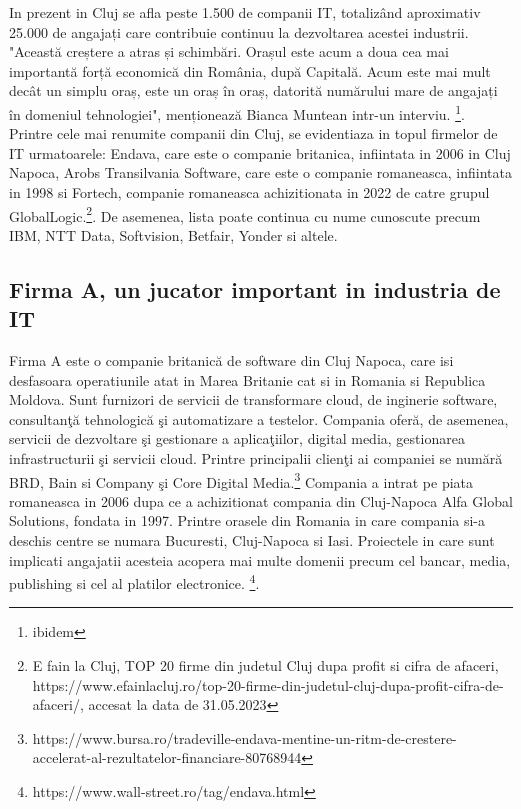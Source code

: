 \documentclass[a4paper, 12pt]{article}
\begin{document}
	\quad \quad In prezent in Cluj se afla peste 1.500 de companii IT, totalizând aproximativ 25.000 de angajați care contribuie continuu la dezvoltarea acestei industrii. "Această creștere a atras și schimbări. Orașul este acum a doua cea mai importantă forță economică din România, după Capitală. Acum este mai mult decât un simplu oraș, este un oraș în oraș, datorită numărului mare de angajați în domeniul tehnologiei", menționează Bianca Muntean intr-un interviu. \footnote{ibidem}. Printre cele mai renumite companii din Cluj, se evidentiaza in topul firmelor de IT urmatoarele: Endava, care este o companie britanica, infiintata in 2006 in Cluj Napoca, Arobs Transilvania Software, care este o companie romaneasca, infiintata in 1998 si Fortech, companie romaneasca achizitionata in 2022 de catre grupul GlobalLogic.\footnote{E fain la Cluj, TOP 20 firme din judetul Cluj dupa profit si cifra de afaceri, https://www.efainlacluj.ro/top-20-firme-din-judetul-cluj-dupa-profit-cifra-de-afaceri/, accesat la data de 31.05.2023}. De asemenea, lista poate continua cu nume cunoscute precum IBM, NTT Data, Softvision, Betfair, Yonder si altele.




	\subsection {Firma A, un jucator important in industria de IT}

	\quad\quad Firma A este o companie britanică de software din Cluj Napoca, care isi  desfasoara operatiunile atat in Marea Britanie cat si in Romania si Republica Moldova. Sunt furnizori de servicii de transformare cloud, de inginerie software, consultanţă tehnologică şi automatizare a testelor. Compania oferă, de asemenea, servicii de dezvoltare şi gestionare a aplicaţiilor, digital media, gestionarea infrastructurii şi servicii cloud. Printre principalii clienţi ai companiei se numără BRD, Bain si Company şi Core Digital Media.\footnote{https://www.bursa.ro/tradeville-endava-mentine-un-ritm-de-crestere-accelerat-al-rezultatelor-financiare-80768944} Compania a intrat pe piata romaneasca in 2006 dupa ce a achizitionat compania din Cluj-Napoca Alfa Global Solutions, fondata in 1997. Printre orasele din Romania in care compania si-a deschis centre se numara Bucuresti, Cluj-Napoca si Iasi. Proiectele in care sunt implicati angajatii acesteia acopera mai multe domenii precum cel bancar, media, publishing si cel al platilor electronice. \footnote{https://www.wall-street.ro/tag/endava.html}.
\end{document}
